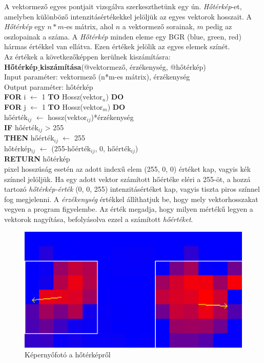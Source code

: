 
A vektormező egyes pontjait vizsgálva szerkeszthetünk egy ún. \textit{Hőtérkép}-et, amelyben különböző intenzitásértékekkel jelöljük az egyes vektorok hosszait. A \textit{Hőtérkép} egy $n*m$-es mátrix, ahol $n$ a vektormező sorainak, $m$ pedig az oszlopainak a száma. A \textit{Hőtérkép} minden eleme egy BGR (blue, green, red) hármas értékkel van ellátva. Ezen értékek jelölik az egyes elemek színét.\\
Az értékek a következőképpen kerülnek kiszámításra:\\
\newline
\noindent \textbf{Hőtérkép$\_$kiszámítása}(@vektormező, érzékenység, @hőtérkép)\\ 
Input paraméter: vektormező (n*m-es mátrix), érzékenység\\
Output paraméter: hőtérkép\\
\textbf{FOR} i $\leftarrow$ 1 \textbf{TO} Hossz(vektor$_n$) \textbf{DO}\\
\indent \textbf{FOR} j $\leftarrow$ 1 \textbf{TO} Hossz(vektor$_m$) \textbf{DO}\\
\indent \indent hőérték$_{ij}$ $\leftarrow$ hossz(vektor$_{ij}$)*érzékenység\\
\indent \indent \textbf{IF} hőérték$_{ij}$ > 255\\
\indent \indent \indent \textbf{THEN} hőérték$_{ij}$ $\leftarrow$ 255\\
\indent \indent hőtérkép$_{ij}$ $\leftarrow$ (255-hőérték$_{ij}$, 0, hőérték$_{ij}$)\\
\textbf{RETURN} hőtérkép\\
 pixel hosszúság esetén az adott indexű elem (255, 0, 0) értéket kap, vagyis kék színnel jelöljük. Ha egy adott vektor számított hőértéke eléri a 255-öt, a hozzá tartozó \textit{hőtérkép-érték} (0, 0, 255) intenzitásértéket kap, vagyis tiszta piros színnel fog megjelenni.
A \textit{érzékenység} értékkel állíthatjuk be, hogy mely vektorhosszakat vegyen a program figyelembe. Az érték megadja, hogy milyen mértékű legyen a vektorok nagyítása, befolyásolva ezzel a számított \textit{hőértéket}.

\begin{figure}[h]
\centering
\includegraphics[width=11.2truecm, height=6.3truecm]{images/HeatMap_screenshot.png}
\caption{Képernyőfotó a hőtérképről}
\label{fig:heatmap}
\end{figure}


